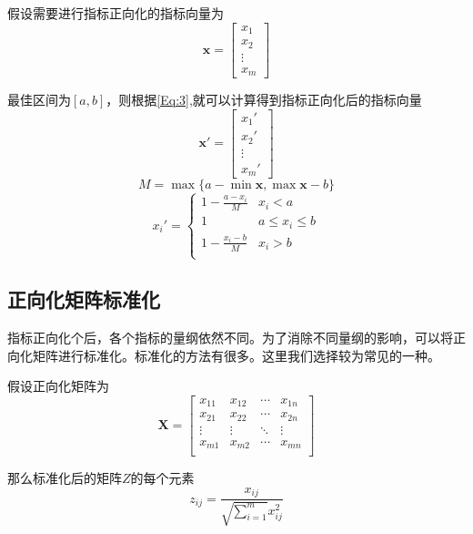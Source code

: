\documentclass[withoutpreface]{cumcmthesis}
\begin{document}
    假设需要进行指标正向化的指标向量为$$\mathbf{x}=\begin{bmatrix}
        x_1 \\ x_2 \\ \vdots \\ x_m
    \end{bmatrix}$$
    
    最佳区间为$[a,b]$，则根据\cref{Eq:3},就可以计算得到指标正向化后的指标向量
    $$\mathbf{x}'=\begin{bmatrix}
        x_1' \\ x_2' \\ \vdots \\ x_m'
    \end{bmatrix}$$
    \begin{equation*}
        M=\max \{a-\min \mathbf{x},\max \mathbf{x}-b\}
    \end{equation*}
    \begin{equation}\label{Eq:3}
        x_i'=\begin{cases}
            1-\frac{a-x_i}{M} & x_i<a \\ 
            1 & a\le x_i \le b \\ 
            1-\frac{x_i-b}{M} & x_i>b \\
        \end{cases}
    \end{equation}

    \subsection{正向化矩阵标准化}

    指标正向化个后，各个指标的量纲依然不同。为了消除不同量纲的影响，可以将正向化矩阵进行标准化。标准化的方法有很多。这里我们选择较为常见的一种。

    假设正向化矩阵为
    $$\mathbf{X}=\begin{bmatrix}
        x_{11} & x_{12} & \cdots & x_{1n} \\ 
        x_{21} & x_{22} & \cdots & x_{2n} \\
        \vdots & \vdots & \ddots & \vdots \\ 
        x_{m1} & x_{m2} & \cdots & x_{mn} \\
    \end{bmatrix}$$

    那么标准化后的矩阵$Z$的每个元素
    \begin{equation}
        z_{ij} = \frac{x_{ij}}{\sqrt{\sum\limits_{i=1}^{m}} x_{ij}^2}
    \end{equation}
\end{document}
